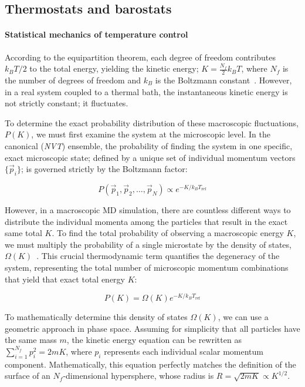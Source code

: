 \subsection{Thermostats and barostats}

\paragraph{Statistical mechanics of temperature control}

According to the equipartition theorem, each degree of freedom contributes $k_B T / 2$ to the total energy, yielding the kinetic energy; $K = \frac{N_f}{2} k_B T$, where $N_f$ is the number of degrees of freedom and $k_B$ is the Boltzmann constant~\cite{nolting2018theoretical}. However, in a real system coupled to a thermal bath, the instantaneous kinetic energy is not strictly constant; it fluctuates. 

To determine the exact probability distribution of these macroscopic fluctuations, $P(K)$, we must first examine the system at the microscopic level. In the canonical (\textit{NVT}) ensemble, the probability of finding the system in one specific, exact microscopic state; defined by a unique set of individual momentum vectors $\{\vec{p}_i\}$; is governed strictly by the Boltzmann factor:

\begin{equation}
    P(\vec{p}_1, \vec{p}_2, \dots, \vec{p}_N) \propto e^{-K / k_B T_{\text{ref}}}
\end{equation}

However, in a macroscopic MD simulation, there are countless different ways to distribute the individual momenta among the particles that result in the exact same total $K$. To find the total probability of observing a macroscopic energy $K$, we must multiply the probability of a single microstate by the density of states, $\Omega(K)$~\cite{termo_metad_presion}. This crucial thermodynamic term quantifies the degeneracy of the system, representing the total number of microscopic momentum combinations that yield that exact total energy $K$:

\begin{equation}
    P(K) = \Omega(K) e^{-K / k_B T_{\text{ref}}}
\end{equation}

To mathematically determine this density of states $\Omega(K)$, we can use a geometric approach in phase space. Assuming for simplicity that all particles have the same mass $m$, the kinetic energy equation can be rewritten as $\sum_{i=1}^{N_f} p_i^2 = 2mK$, where $p_i$ represents each individual scalar momentum component. Mathematically, this equation perfectly matches the definition of the surface of an $N_f$-dimensional hypersphere, whose radius is $R = \sqrt{2mK} \propto K^{1/2}$. 

